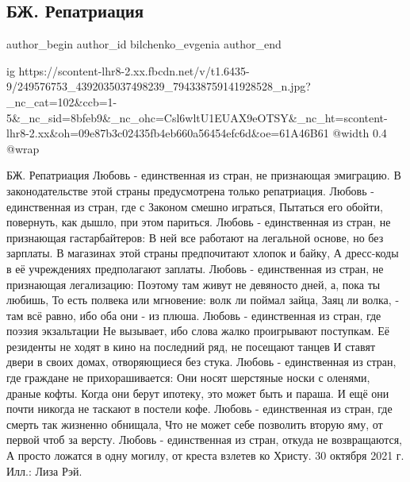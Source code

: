  
 
 
 
 
 
\subsection{БЖ. Репатриация}
\label{sec:30_10_2021.fb.bilchenko_evgenia.2.repatriacia}
 
\ifcmt
 author_begin
   author_id bilchenko_evgenia
 author_end
\fi

\ifcmt
  ig https://scontent-lhr8-2.xx.fbcdn.net/v/t1.6435-9/249576753_4392035037498239_794338759141928528_n.jpg?_nc_cat=102&ccb=1-5&_nc_sid=8bfeb9&_nc_ohc=Csl6wltU1EUAX9eOTSY&_nc_ht=scontent-lhr8-2.xx&oh=09e87b3c02435fb4eb660a56454efc6d&oe=61A46B61
  @width 0.4
  @wrap 
\fi

БЖ. Репатриация
Любовь - единственная из стран, не признающая эмиграцию.
В законодательстве этой страны предусмотрена только репатриация.
Любовь - единственная из стран, где с Законом смешно играться,
Пытаться его обойти, повернуть, как дышло, при этом париться.
Любовь - единственная из стран, не признающая гастарбайтеров:
В ней все работают на легальной основе, но без зарплаты.
В магазинах этой страны предпочитают хлопок и байку,
А дресс-коды в её учреждениях предполагают заплаты.
Любовь - единственная из стран, не признающая легализацию:
Поэтому там живут не девяносто дней, а, пока ты любишь,
То есть полвека или мгновение: волк ли поймал зайца,
Заяц ли волка, - там всё равно, ибо оба они - из плюша.
Любовь - единственная из стран, где поэзия экзальтации
Не вызывает, ибо слова жалко проигрывают поступкам.
Её резиденты не ходят в кино на последний ряд, не посещают танцев
И ставят двери в своих домах, отворяющиеся без стука.
Любовь - единственная из стран, где граждане не прихорашивается:
Они носят шерстяные носки с оленями, драные кофты.
Когда они берут ипотеку, это может быть и параша.
И ещё они почти никогда не таскают в постели кофе.
Любовь - единственная из стран, где смерть так жизненно обнищала,
Что не может себе позволить вторую яму, от первой чтоб за версту.
Любовь - единственная из стран, откуда не возвращаются, 
А просто ложатся в одну могилу, от креста взлетев ко Христу. 
30 октября 2021 г.
Илл.: Лиза Рэй.
